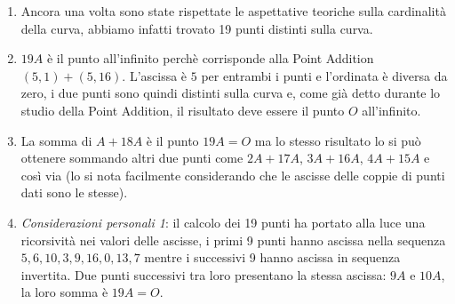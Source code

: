 \documentclass[a4paper,12pt]{tesiinfo}
\renewcommand{\footnotesize}{\fontsize{9pt}{11pt}\selectfont}
\begin{document}
\begin{enumerate}
 
 \item Ancora una volta sono state rispettate le aspettative teoriche sulla cardinalit\`a della curva, abbiamo infatti trovato 19 punti distinti sulla curva.
 
 \item $19A$ \`e il punto all'infinito perch\`e corrisponde alla Point Addition $(5, 1) + (5, 16)$. L'ascissa \`e $5$ per entrambi i punti e l'ordinata \`e diversa da zero, i due punti sono quindi distinti sulla curva e, come gi\`a detto durante lo studio della Point Addition, il risultato deve essere il punto $O$ all'infinito.
 
 \item La somma di $A + 18A$ \`e il punto $19A = O$ ma lo stesso risultato lo si pu\`o ottenere sommando altri due punti come $2A + 17A$, $3A + 16A$, $4A + 15A$ e cos\`i via (lo si nota facilmente considerando che le ascisse delle coppie di punti dati sono le stesse).
 \item \textit{Considerazioni personali 1}: il calcolo dei 19 punti ha portato alla luce una ricorsivit\`a 
%
nei valori delle ascisse, i primi 9 punti hanno ascissa nella sequenza $5, 6, 10, 3, 9, 16, 0, 13, 7$ mentre i successivi 9 hanno ascissa in sequenza invertita. Due punti successivi tra loro presentano la stessa ascissa: $9A$ e $10A$, la loro somma \`e $19A = O$. 

\end{enumerate}
\end{document}
